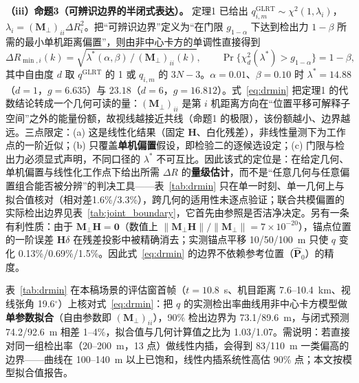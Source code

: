 \documentclass[UTF8,a4paper,zihao=-4]{ctexart}
\begin{document}
\noindent\textbf{（iii）命题3（可辨识边界的半闭式表达）。}\quad
定理1 已给出 \(q^{\mathrm{GLRT}}_{i,m}\sim\chi^2(1,\lambda_i)\)，\(\lambda_i=(\boldsymbol M_\perp)_{ii}\Delta R_i^2\)。把“可辨识边界”定义为“在门限 \(g_{1-\alpha}\) 下达到检出力 \(1-\beta\) 所需的最小单机距离偏置”，则由非中心卡方的单调性直接得到
\begin{equation}
\Delta R_{\min,i}(k)=\sqrt{\lambda^*(\alpha,\beta)\,\big/\,(\boldsymbol M_\perp)_{ii}(k)},
\qquad
\Pr\bigl\{\chi^2_{d}(\lambda^*)>g_{1-\alpha}\bigr\}=1-\beta,
\label{eq:drmin}
\end{equation}
其中自由度 \(d\) 取 \(q^{\mathrm{GLRT}}\) 的 1 或 \(q_{i,m}\) 的 \(3N-3\)。\(\alpha=0.01\)、\(\beta=0.10\) 时 \(\lambda^*=14.88\)（\(d=1\)，\(g=6.635\)）与 \(23.18\)（\(d=6\)，\(g=16.812\)）。式~\eqref{eq:drmin} 把定理1 的代数结论转成一个几何可读的量：\((\boldsymbol M_\perp)_{ii}\) 是第 \(i\) 机距离方向在“位置平移可解释子空间”之外的能量份额，故视线越接近共线（命题1 的极限），该份额越小、边界越远。三点限定：(a) 这是线性化结果（固定 \(\boldsymbol H\)、白化残差），非线性量测下为工作点的一阶近似；(b) 只覆盖\textbf{单机偏置}假设，即检验二的逐候选设定；(c) 门限与检出力必须显式声明，不同口径的 \(\lambda^*\) 不可互比。因此该式的定位是：在给定几何、单机偏置与线性化工作点下给出所需 \(\Delta R\) 的\textbf{量级估计}，而不是“任意几何与任意偏置组合能否被分辨”的判决工具——表~\ref{tab:drmin} 只在单一时刻、单一几何上与拟合值核对（相对差1.6\%/3.3\%），跨几何的适用性未逐点验证；联合共模偏置的实际检出边界见表~\ref{tab:joint_boundary}，它首先由参照是否洁净决定。另有一条有利性质：由于 \(\boldsymbol M_\perp\boldsymbol H=\boldsymbol 0\)（数值上 \(\|\boldsymbol M_\perp\boldsymbol H\|/\|\boldsymbol M_\perp\|=7\times10^{-20}\)），锚点位置的一阶误差 \(\boldsymbol H\delta\) 在残差投影中被精确消去；实测锚点平移 10/50/100~m 只使 \(q\) 变化 0.13\%/0.69\%/1.5\%。因此式~\eqref{eq:drmin} 的边界不依赖参考位置（\(\hat{\boldsymbol P}_0\)）的精度。

表~\ref{tab:drmin} 在本稿场景的评估窗首帧（\(t=10.8\)~s、机目距离 7.6--10.4~km、视线张角 19.6\(^\circ\)）上核对式~\eqref{eq:drmin}：把 \(q\) 的实测检出率曲线用非中心卡方模型做\textbf{单参数拟合}（自由参数即 \((\boldsymbol M_\perp)_{ii}\)），90\% 检出边界为 73.1/89.6~m，与闭式预测 74.2/92.6~m 相差 1--4\%，拟合值与几何计算值之比为 1.03/1.07。需说明：若直接对同一组检出率（20--200~m，13 点）做线性内插，会得到 83/110~m 一类偏高的边界——曲线在 100--140~m 以上已饱和，线性内插系统性高估 90\% 点；本文按模型拟合值报告。
\end{document}
